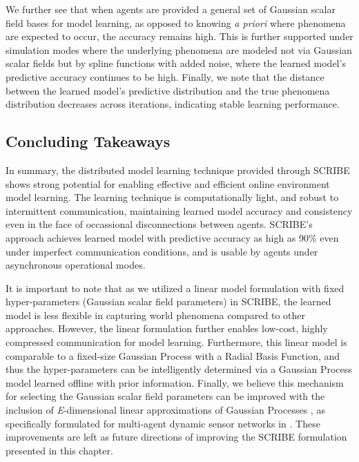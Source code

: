 We further see that when agents are provided a general set of Gaussian scalar field bases for model learning, as opposed to knowing \textit{a priori} where phenomena are expected to occur, the accuracy remains high. This is further supported under simulation modes where the underlying phenomena are modeled not via Gaussian scalar fields but by spline functions with added noise, where the learned model's predictive accuracy continues to be high. Finally, we note that the distance between the learned model's predictive distribution and the true phenomena distribution decreases across iterations, indicating stable learning performance.

\subsection{Concluding Takeaways}

In summary, the distributed model learning technique provided through SCRIBE shows strong potential for enabling effective and efficient online environment model learning. The learning technique is computationally light, and  robust to intermittent communication, maintaining learned model accuracy and consistency even in the face of occassional disconnections between agents. SCRIBE's approach achieves learned model with predictive accuracy as high as 90\% even under imperfect communication conditions, and is usable by agents under asynchronous operational modes.

It is important to note that as we utilized a linear model formulation with fixed hyper-parameters (Gaussian scalar field parameters) in SCRIBE, the learned model is less flexible in capturing world phenomena compared to other approaches. However, the linear formulation further enables low-cost, highly compressed communication for model learning. Furthermore, this linear model is comparable to a fixed-size Gaussian Process with a Radial Basis Function, and thus the hyper-parameters can be intelligently determined via a Gaussian Process model learned offline with prior information. Finally, we believe this mechanism for selecting the Gaussian scalar field parameters can be improved with the inclusion of \textit{E}-dimensional linear approximations of Gaussian Processes \cite{pillonetto2018distributed}, as specifically formulated for multi-agent dynamic sensor networks in \cite{jang2021fully, kim2023distributed}. These improvements are left as future directions of improving the SCRIBE formulation presented in this chapter.